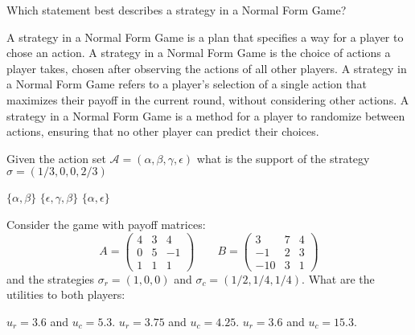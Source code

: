 \documentclass{exam}
\begin{document}
\begin{questions}
        
\question Which statement best describes a strategy in a Normal Form Game?
\begin{checkboxes}
    \choice A strategy in a Normal Form Game is a plan that specifies a way for a player to chose an action.
    \choice A strategy in a Normal Form Game is the choice of actions a player takes, chosen after observing the actions of all other players.
    \choice A strategy in a Normal Form Game refers to a player's selection of a single action that maximizes their payoff in the current round, without considering other actions.
    \choice A strategy in a Normal Form Game is a method for a player to randomize between actions, ensuring that no other player can predict their choices.
\end{checkboxes}

\question Given the action set \(\mathcal{A} = (\alpha, \beta, \gamma,
    \epsilon)\) what is the support of the strategy \(\sigma=(1/3, 0, 0, 2/3)\)

\begin{checkboxes}
    \choice \(\{\alpha, \beta\}\)
    \choice \(\{\epsilon, \gamma, \beta\}\)
    \choice \(\{\alpha, \epsilon\}\)
\end{checkboxes}


\question Consider the game with payoff matrices: 
    \[
        A=\begin{pmatrix}4 & 3 & 4\\
                       0 & 5 & -1\\
                       1 & 1 & 1 
        \end{pmatrix}
        \qquad
        B=\begin{pmatrix}3 & 7 & 4\\
                       -1 & 2 & 3\\
                       -10 & 3 & 1 
        \end{pmatrix}
    \]
    and the strategies \(\sigma_r = (1, 0 ,0)\) and \(\sigma_c=(1/2, 1/4,
    1/4)\). What are the utilities to both players:

\begin{checkboxes}
    \choice \(u_r=3.6\) and \(u_c=5.3\).
    \choice \(u_r=3.75\) and \(u_c=4.25\).
    \choice \(u_r=3.6\) and \(u_c=15.3\).
\end{checkboxes}

\end{questions}
\end{document}
